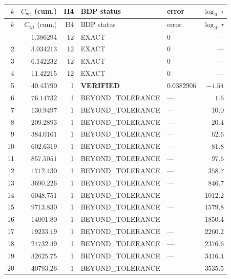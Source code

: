 \documentclass[11pt]{article}
\begin{document}
\footnotesize
\begin{longtable}{@{}r r r l l r@{}}
\toprule
$k$ & $C_{\text{wt}}$ (cum.) & H4 & BDP status & error & $\log_{10}\tau$ \\
\midrule
\endfirsthead
\toprule
$k$ & $C_{\text{wt}}$ (cum.) & H4 & BDP status & error & $\log_{10}\tau$ \\
\midrule
\endhead
\bottomrule
\endfoot
1  & $1.386294$    & 12 & EXACT             & $0$         & --- \\
2  & $3.034213$    & 12 & EXACT             & $0$         & --- \\
3  & $6.142232$    & 12 & EXACT             & $0$         & --- \\
4  & $11.42215$    & 12 & EXACT             & $0$         & --- \\
5  & $40.43790$    & 1  & \textbf{VERIFIED} & $0.0382906$ & $-1.54$ \\
6  & $76.14732$    & 1  & BEYOND\_TOLERANCE & ---         & $1.6$ \\
7  & $130.9497$    & 1  & BEYOND\_TOLERANCE & ---         & $10.0$ \\
8  & $209.2893$    & 1  & BEYOND\_TOLERANCE & ---         & $20.4$ \\
9  & $384.0161$    & 1  & BEYOND\_TOLERANCE & ---         & $62.6$ \\
10 & $602.6319$    & 1  & BEYOND\_TOLERANCE & ---         & $81.8$ \\
11 & $857.5051$    & 1  & BEYOND\_TOLERANCE & ---         & $97.6$ \\
12 & $1712.430$    & 1  & BEYOND\_TOLERANCE & ---         & $358.7$ \\
13 & $3690.226$    & 1  & BEYOND\_TOLERANCE & ---         & $846.7$ \\
14 & $6048.751$    & 1  & BEYOND\_TOLERANCE & ---         & $1012.2$ \\
15 & $9713.830$    & 1  & BEYOND\_TOLERANCE & ---         & $1579.8$ \\
16 & $14001.80$    & 1  & BEYOND\_TOLERANCE & ---         & $1850.4$ \\
17 & $19233.19$    & 1  & BEYOND\_TOLERANCE & ---         & $2260.2$ \\
18 & $24732.49$    & 1  & BEYOND\_TOLERANCE & ---         & $2376.6$ \\
19 & $32625.75$    & 1  & BEYOND\_TOLERANCE & ---         & $3416.4$ \\
20 & $40793.26$    & 1  & BEYOND\_TOLERANCE & ---         & $3535.5$ \\
\end{longtable}
\normalsize
\end{document}
